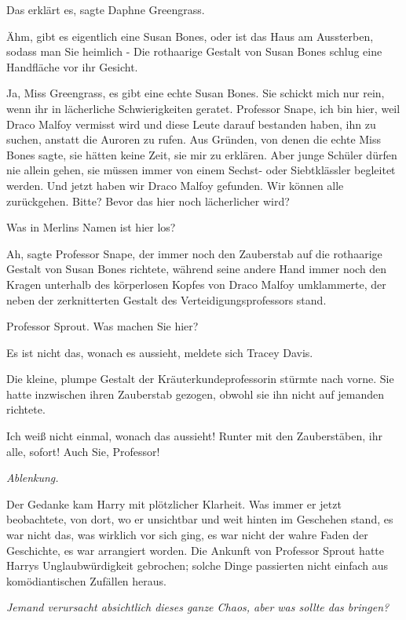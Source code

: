 \glqq{}Das erklärt es\grqq{}, sagte Daphne Greengrass.

\glqq{}Ähm, gibt es eigentlich eine Susan Bones, oder ist das Haus am Aussterben,
sodass man Sie heimlich -\grqq{} Die rothaarige Gestalt von Susan Bones schlug eine
Handfläche vor ihr Gesicht.

\glqq{}Ja, Miss Greengrass, es gibt eine echte Susan Bones. Sie schickt mich nur
rein, wenn ihr in lächerliche Schwierigkeiten geratet. Professor Snape, ich bin
hier, weil Draco Malfoy vermisst wird und diese Leute darauf bestanden haben,
ihn zu suchen, anstatt die Auroren zu rufen. Aus Gründen, von denen die echte
Miss Bones sagte, sie hätten keine Zeit, sie mir zu erklären. Aber junge Schüler
dürfen nie allein gehen, sie müssen immer von einem Sechst- oder Siebtklässler
begleitet werden. Und jetzt haben wir Draco Malfoy gefunden. Wir können alle
zurückgehen. Bitte? Bevor das hier noch lächerlicher wird?\grqq{}

\glqq{}Was in Merlins Namen ist hier los?\grqq{}

\glqq{}Ah\grqq{}, sagte Professor Snape, der immer noch den Zauberstab auf die
rothaarige Gestalt von Susan Bones richtete, während seine andere Hand immer
noch den Kragen unterhalb des körperlosen Kopfes von Draco Malfoy umklammerte,
der neben der zerknitterten Gestalt des Verteidigungsprofessors stand.

\glqq{}Professor Sprout. Was machen Sie hier?\grqq{}

\glqq{}Es ist nicht das, wonach es aussieht\grqq{}, meldete sich Tracey Davis.

Die kleine, plumpe Gestalt der Kräuterkundeprofessorin stürmte nach vorne. Sie
hatte inzwischen ihren Zauberstab gezogen, obwohl sie ihn nicht auf jemanden
richtete.

\glqq{}Ich weiß nicht einmal, wonach das aussieht! Runter mit den Zauberstäben,
ihr alle, sofort! Auch Sie, Professor!\grqq{}

\emph{Ablenkung.}

Der Gedanke kam Harry mit plötzlicher Klarheit. Was immer er jetzt beobachtete,
von dort, wo er unsichtbar und weit hinten im Geschehen stand, es war nicht das,
was wirklich vor sich ging, es war nicht der wahre Faden der Geschichte, es war
arrangiert worden. Die Ankunft von Professor Sprout hatte Harrys
Unglaubwürdigkeit gebrochen; solche Dinge passierten nicht einfach aus
komödiantischen Zufällen heraus.

\emph{Jemand verursacht absichtlich dieses ganze Chaos, aber was sollte das
bringen?}

